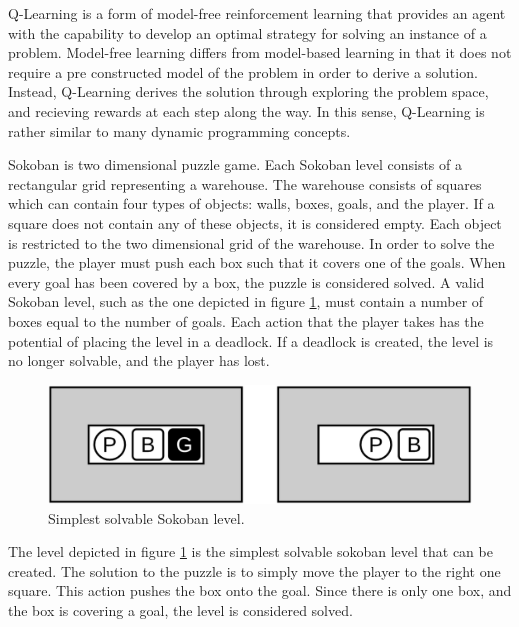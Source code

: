 \documentclass[times, 10pt,twocolumn]{article}
\begin{document}
Q-Learning is a form of model-free reinforcement learning that provides an agent with the capability to develop an optimal strategy for solving an instance of a problem. Model-free learning differs from model-based learning in that it does not require a pre constructed model of the problem in order to derive a solution. Instead, Q-Learning derives the solution through exploring the problem space, and recieving rewards at each step along the way. In this sense, Q-Learning is rather similar to many dynamic programming concepts.


Sokoban is two dimensional puzzle game. Each Sokoban level consists of a rectangular grid representing a warehouse. The warehouse consists of squares which can contain four types of objects: walls, boxes, goals, and the player. If a square does not contain any of these objects, it is considered empty. Each object is restricted to the two dimensional grid of the warehouse. In order to solve the puzzle, the player must push each box such that it covers one of the goals. When every goal has been covered by a box, the puzzle is considered solved. A valid Sokoban level, such as the one depicted in figure \ref{fig:b}, must contain a number of boxes equal to the number of goals. Each action that the player takes has the potential of placing the level in a deadlock. If a deadlock is created, the level is no longer solvable, and the player has lost.

\begin{figure}[h] 
  \centering
     \includegraphics[width=0.7\linewidth]{images/basic_unsolved_solved.png}
  \caption{Simplest solvable Sokoban level.}
  \label{fig:b}
\end{figure}

The level depicted in figure \ref{fig:b} is the simplest solvable sokoban level that can be created. The solution to the puzzle is to simply move the player to the right one square. This action pushes the box onto the goal. Since there is only one box, and the box is covering a goal, the level is considered solved.

\end{document}
